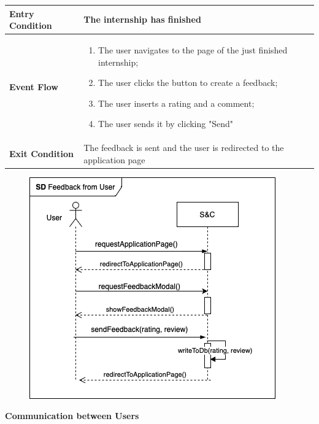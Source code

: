 \begin{enumerate}[label=\textbf{[US\arabic*]}, left = 0pt, align = left, resume]
\begin{longtable}{|l|p{11cm}|}
                \textbf{Entry Condition} & 
                    The internship has finished\\
                \hline
                
                \textbf{Event Flow} &
                    \begin{enumerate}[label=\arabic*., itemsep=0.2em]
                        \item The user navigates to the page of the just finished internship;
                        \item The user clicks the button to create a feedback;
                        \item The user inserts a rating and a comment;
                        \item The user sends it by clicking "Send" 
                    \end{enumerate} \\
                \hline
                
                \textbf{Exit Condition} & 
                    The feedback is sent and the user is redirected to the application page \\
                \hline
                \hline
            \end{longtable}

            \begin{figure}[h!]
                \centering        \includegraphics{RASD/Images/UseCases/FeedbackFromUser.drawio.png}
                \label{fig:example}
                \end{figure}
\newpage

\item \textbf{Communication between Users}
            

\end{enumerate}
